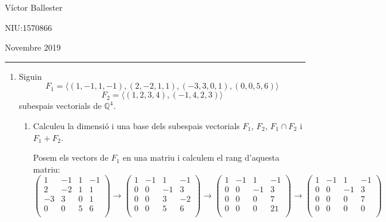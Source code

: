 \documentclass[11pt,a4paper]{article}
\begin{document}
\begin{flushright}
    Víctor Ballester\par NIU:1570866\par Novembre 2019
\end{flushright}
\rule{180mm}{0.1mm}
\begin{enumerate}
    \item Siguin $$F_1=\langle(1,-1,1,-1),(2,-2,1,1),(-3,3,0,1),(0,0,5,6)\rangle $$ $$F_2=\langle(1,2,3,4),(-1,4,2,3)\rangle $$ subespais vectorials de $\mathbb{Q}^4$.
    \begin{enumerate}
        \item Calculeu la dimensió i una base dels subespais vectorials $F_1$, $F_2$, $F_1\cap F_2$ i $F_1+F_2$.\par
        Posem els vectors de $F_1$ en una matriu i calculem el rang d'aquesta matriu:
        \begin{equation*}
            \begin{pmatrix}
              1 & -1 & 1 & -1 \\
              2 & -2 & 1 & 1 \\
              -3 & 3 & 0 & 1 \\
              0 & 0 & 5 & 6 \\
           \end{pmatrix}\rightarrow\begin{pmatrix}
              1 & -1 & 1 & -1 \\
              0 & 0 & -1 & 3 \\
              0 & 0 & 3 & -2 \\
              0 & 0 & 5 & 6 \\
           \end{pmatrix}\rightarrow\begin{pmatrix}
              1 & -1 & 1 & -1 \\
              0 & 0 & -1 & 3 \\
              0 & 0 & 0 & 7 \\
              0 & 0 & 0 & 21 \\
           \end{pmatrix}
           \rightarrow\begin{pmatrix}
              1 & -1 & 1 & -1 \\
              0 & 0 & -1 & 3 \\
              0 & 0 & 0 & 7 \\
              0 & 0 & 0 & 0 \\
           \end{pmatrix}

\end{equation*}
\end{enumerate}
\end{enumerate}
\end{document}
